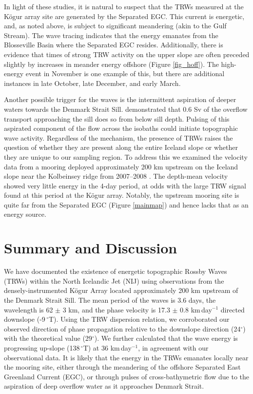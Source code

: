 \documentclass[12pt,titlepage,figuresatend]{article}
\begin{document}
In light of these studies, it is natural to suspect that the TRWs measured at the K\"{o}gur array site are generated by the Separated EGC. This current is energetic, and, as noted above, is subject to significant meandering (akin to the Gulf Stream). The wave tracing indicates that the energy emanates from the Blosseville Basin where the Separated EGC resides. Additionally, there is evidence that times of strong TRW activity on the upper slope are often preceded slightly by increases in meander energy offshore (Figure \ref{fig_hoff}). The high-energy event in November is one example of this, but there are additional instances in late October, late December, and early March. 

Another possible trigger for the waves is the intermittent aspiration of deeper waters towards the Denmark Strait Sill. \cite{Harden2016} demonstrated that 0.6 Sv of the overflow transport approaching the sill does so from below sill depth. Pulsing of this aspirated component of the flow across the isobaths could initiate topographic wave activity. Regardless of the mechanism, the presence of TRWs raises the question of whether they are present along the entire Iceland slope or whether they are unique to our sampling region. To address this we examined the velocity data from a mooring deployed approximately 200 km upstream on the Iceland slope near the Kolbeinsey ridge from 2007--2008 \cite[]{Jonsson2012}. The depth-mean velocity showed very little energy in the 4-day period, at odds with the large TRW signal found at this period at the K\"{o}gur array. Notably, the upstream mooring site is quite far from the Separated EGC (Figure \ref{mainmap}) and hence lacks that as an energy source. 


\section{Summary and Discussion}

We have documented the existence of energetic topographic Rossby Waves (TRWs) within the North Icelandic Jet (NIJ) using observations from the densely-instrumented K\"{o}gur Array located approximately 200 km upstream of the Denmark Strait Sill. The mean period of the waves is 3.6 days, the wavelength is 62 $\pm$ 3 km, and the phase velocity is 17.3 $\pm$ 0.8 km$\,$day$^{-1}$ directed downslope (-9$\,^{\circ}$T). Using the TRW dispersion relation, we corroborated our observed direction of phase propagation relative to the downslope direction (24$^{\circ}$) with the theoretical value (29$^{\circ}$). We further calculated that the wave energy is progressing up-slope (138$\,^{\circ}$T) at 36 km$\,$day$^{-1}$, in agreement with our observational data. It is likely that the energy in the TRWs emanates locally near the mooring site, either through the meandering of the offshore Separated East Greenland Current (EGC), or through pulses of cross-bathymetric flow due to the aspiration of deep overflow water as it approaches Denmark Strait. 
\end{document}
